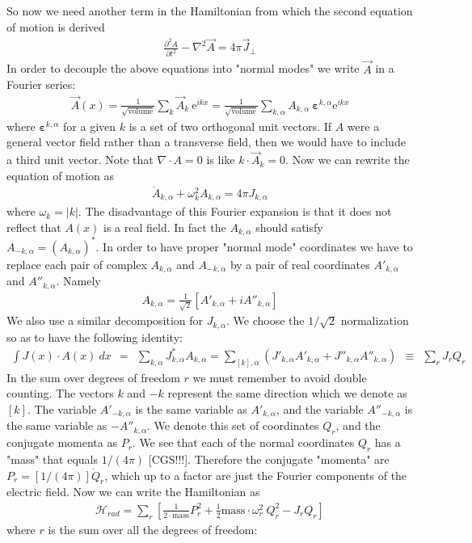\documentclass[onecolumn,fleqn]{revtex4}
\newcommand{\eexp}{\mathrm{e}^}
\newcommand{\beq}{\begin{eqnarray}}
\newcommand{\eeq}{\end{eqnarray}}
\begin{document}
So now we need another term in the Hamiltonian 
from which the second equation of motion is derived  
\beq
\frac{\partial^{2} A}{\partial t^{2}} 
-\nabla^{2}\vec{A}
= 4\pi \vec{J}_{\perp}
\eeq
In order to decouple the above equations into "normal modes" 
we write $\vec{A}$ in a Fourier series: 
\beq
\vec{A}(x) 
= \frac{1}{\sqrt{\mbox{volume}}} \sum_{k} \vec{A}_{k} \ \eexp{ikx} 
= \frac{1}{\sqrt{\mbox{volume}}} \sum_{k,\alpha} A_{k,\alpha}
\ \bm{\varepsilon}^{k,\alpha} \eexp{ikx} 
\eeq
where $\bm{\varepsilon}^{k,\alpha}$ for a given $k$ is a set 
of two orthogonal unit vectors. If $A$ were a general vector field 
rather than a transverse field, then we would have to include 
a third unit vector. Note that $\nabla \cdot A=0$  
is like  $ k \cdot \vec{A}_k =0$. Now we can rewrite 
the equation of motion as 
\beq
\ddot{A}_{k,\alpha} + \omega_k^2 A_{k,\alpha} = 4\pi J_{k,\alpha}
\eeq
where $\omega_k=|k|$.
The disadvantage of this Fourier expansion is that 
it does not reflect that $A(x)$ is a real field. 
In fact the $A_{k,\alpha}$ should satisfy 
$A_{-k,\alpha}=(A_{k,\alpha})^*$. In order to 
have proper "normal mode" coordinates we have 
to replace each pair of complex 
$A_{k,\alpha}$ and $A_{-k,\alpha}$ by 
a pair of real coordinates  
$A'_{k,\alpha}$ and $A''_{k,\alpha}$. Namely
\beq
A_{k,\alpha}  = \frac{1}{\sqrt{2}} [A'_{k,\alpha} + i A''_{k,\alpha}] 
\eeq
We also use a similar decomposition for $J_{k,\alpha}$. 
We choose the $1/\sqrt{2}$ normalization so as to have 
the following identity:
\beq
\int J(x) \cdot A(x) \ dx \ \ = \ \ 
\sum_{k,\alpha} J_{k,\alpha}^{*} A_{k,\alpha} = 
\sum_{[k],\alpha} 
(J'_{k,\alpha} A'_{k,\alpha} + J''_{k,\alpha} A''_{k,\alpha})
\ \ \equiv \ \ \sum_r J_r Q_r
\eeq
In the sum over degrees of freedom $r$ 
we must remember to avoid double counting. 
The vectors $k$ and $-k$ represent the 
same direction which we denote as $[k]$. 
The variable $A'_{-k,\alpha}$ 
is the same variable as $A'_{k,\alpha}$, 
and the variable $A''_{-k,\alpha}$ 
is the same variable as $-A''_{k,\alpha}$. 
We denote this set of coordinates $Q_r$, 
and the conjugate momenta as $P_r$.  
We see that each of the normal coordinates 
$Q_r$ has a "mass" that equals $1/(4\pi)$ [CGS!!!]. 
Therefore the conjugate "momenta" are
$P_r=[1/(4\pi)]\dot{Q}_r$, which up to a factor 
are just the Fourier components of the electric field. 
Now we can write the Hamiltonian as 
\beq
\mathcal{H}_{rad} = 
\sum_{r} \left[
\frac{1}{2\cdot\mbox{mass}} P_r^2 
+ \frac{1}{2}\mbox{mass}\cdot \omega_r^2 \ {Q_r^2} 
- J_r Q_r \right]
\eeq
where $r$ is the sum over all the degrees of freedom:  
\end{document}
